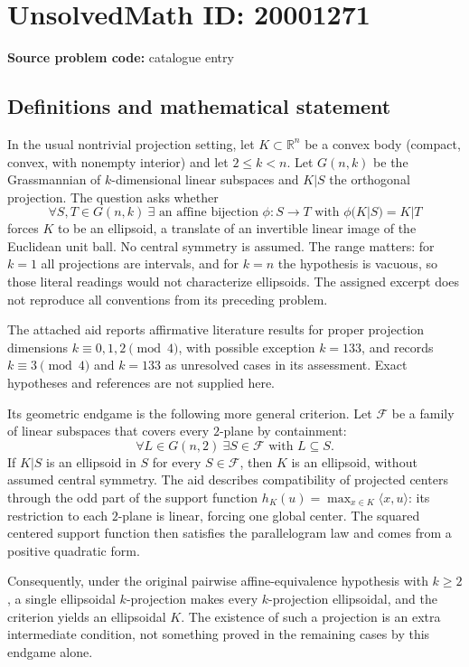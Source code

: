 \documentclass[11pt]{article}
\newcommand{\R}{\mathbb{R}}
\begin{document}
\section*{UnsolvedMath ID: 20001271}
\textbf{Source problem code:} catalogue entry
\subsection{Definitions and mathematical statement}
In the usual nontrivial projection setting, let $K\subset\R^n$ be a convex body (compact, convex, with nonempty interior) and let $2\le k<n$. Let $G(n,k)$ be the Grassmannian of $k$-dimensional linear subspaces and $K|S$ the orthogonal projection. The question asks whether
\[
\forall S,T\in G(n,k)\ \exists\text{ an affine bijection }\phi:S\to T
\text{ with }\phi(K|S)=K|T
\]
forces $K$ to be an ellipsoid, a translate of an invertible linear image of the Euclidean unit ball. No central symmetry is assumed. The range matters: for $k=1$ all projections are intervals, and for $k=n$ the hypothesis is vacuous, so those literal readings would not characterize ellipsoids. The assigned excerpt does not reproduce all conventions from its preceding problem.

The attached aid reports affirmative literature results for proper projection dimensions $k\equiv0,1,2\pmod4$, with possible exception $k=133$, and records $k\equiv3\pmod4$ and $k=133$ as unresolved cases in its assessment. Exact hypotheses and references are not supplied here.

Its geometric endgame is the following more general criterion. Let $\mathcal F$ be a family of linear subspaces that covers every $2$-plane by containment:
\[
\forall L\in G(n,2)\ \exists S\in\mathcal F\text{ with }L\subseteq S.
\]
If $K|S$ is an ellipsoid in $S$ for every $S\in\mathcal F$, then $K$ is an ellipsoid, without assumed central symmetry. The aid describes compatibility of projected centers through the odd part of the support function $h_K(u)=\max_{x\in K}\langle x,u\rangle$: its restriction to each $2$-plane is linear, forcing one global center. The squared centered support function then satisfies the parallelogram law and comes from a positive quadratic form.

Consequently, under the original pairwise affine-equivalence hypothesis with $k\ge2$, a single ellipsoidal $k$-projection makes every $k$-projection ellipsoidal, and the criterion yields an ellipsoidal $K$. The existence of such a projection is an extra intermediate condition, not something proved in the remaining cases by this endgame alone.
\end{document}
